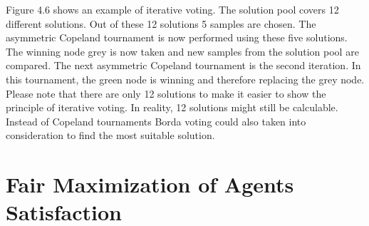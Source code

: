 \documentclass[german, a4paper, 11pt, oneside]{scrbook}
\begin{document}
Figure 4.6 shows an example of iterative voting. The solution pool covers 12 different solutions. Out of these 12 solutions 5 samples are chosen. The asymmetric Copeland tournament is now performed using these five solutions. The winning node grey is now taken and new samples from the solution pool are compared. The next asymmetric Copeland tournament is the second iteration. In this tournament, the green node is winning and therefore replacing the grey node. Please note that there are only 12 solutions to make it easier to show the principle of iterative voting. In reality, 12 solutions might still be calculable. Instead of Copeland tournaments Borda voting could also taken into consideration to find the most suitable solution.











\section{Fair Maximization of Agents Satisfaction}
\end{document}
